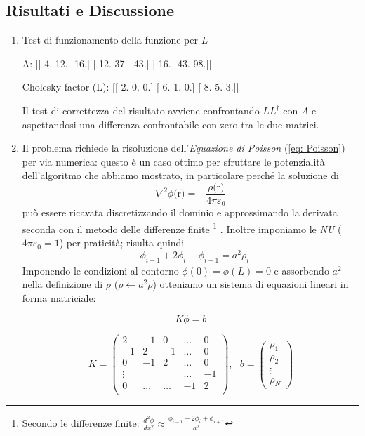 \documentclass[11pt, a4paper]{article}
\begin{document}
\subsection{Risultati e Discussione}
\begin{enumerate}
   \item Test di funzionamento della funzione per $L$
    \begin{elegantcode} 
A:
 [[  4.  12. -16.]
 [ 12.  37. -43.]
 [-16. -43.  98.]]

Cholesky factor (L):
 [[ 2.  0.  0.]
 [ 6.  1.  0.]
 [-8.  5.  3.]]
    \end{elegantcode}
    Il test di correttezza del risultato avviene confrontando $LL^\dagger$ con $A$ e aspettandosi una differenza confrontabile con zero tra le due matrici.

    \item Il problema richiede la risoluzione dell'\textit{Equazione di Poisson} (\ref{eq: Poisson}) per via numerica: questo è un caso ottimo per sfruttare le potenzialità dell'algoritmo che abbiamo mostrato, in particolare perché la soluzione di
    \begin{equation} \label{eq: Poisson}
        \nabla^2 \phi\text{(r)} = -\frac{\rho\text{(r)}}{4\pi\varepsilon_0}
    \end{equation}
    può essere ricavata discretizzando il dominio e approssimando la derivata seconda con il metodo delle differenze finite
    \footnote{Secondo le differenze finite:
    $\frac{d^2\phi}{dx^2} \approx \frac{\phi_{i-1} - 2\phi_i + \phi_{i+1}}{a^2}$
    }
    . Inoltre imponiamo le \textit{NU} ($4\pi \varepsilon_0 = 1$) per praticità; risulta quindi
    $$
    -\phi_{i-1} + 2\phi_i - \phi_{i+1} = a^2\rho_i
    $$
    Imponendo le condizioni al contorno $\phi(0)=\phi(L)=0$ e assorbendo $a^2$ nella definizione di $\rho$ ($\rho \leftarrow{} a^2 \rho$) otteniamo un sistema di equazioni lineari in forma matriciale:
    
    \begin{equation} \label{eq: eq lin poisson}    
    K\phi = b
    \end{equation}

    $$
    K = \begin{pmatrix}
        2 & -1 & 0 & \dots & 0 \\
        -1 & 2 & -1 & \dots & 0 \\
        0 & -1 & 2 & \dots & 0 \\
        \vdots &&& \dots & -1 \\
        0 & \dots & \dots & -1 & 2 \\
    \end{pmatrix},\ \ \ b = \begin{pmatrix}
        \rho_1 \\ \rho_2 \\ \vdots \\ \rho_N
    \end{pmatrix}    
    $$
    

\end{enumerate}
\end{document}
